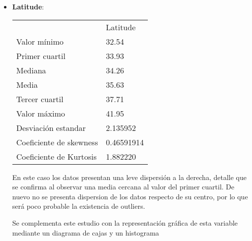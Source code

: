 {\begin{itemize}
Los estadísticos resultantes nos muestran una distribución con una medida de asimetria muy cercana al valor cero, lo que nos indica que la distribución de esta se aproxima a una distribucion normal, pero con cierta dispersión de los datos a la derecha, hecho que claramente se refleja con un valor de la media muy cercano al valor del tercer cuartil.
Un coeficiente de Kurtosis tan cercano a cero nos indica que no se presenta dispersión de los valores respecto al centro de densidad de la distribución.

Se estudia de forma gráfica estos resultados por medio de un diagrama de cajas:

??? Imagen boxplot

Efectivamente el diagrama de cajas nos muestra que los datos se concentran en una región central densa, sin presencia de outliers.
Observemos la distribución de los valores en más detalle en un histograma

??? Imagen histo






	\item \textbf{Latitude}: 
	\begin{table}[]
		\begin{tabular}{ll}
			& Latitude   \\
			Valor mínimo            & 32.54      \\
			Primer cuartil          & 33.93      \\
			Mediana                 & 34.26      \\
			Media                   & 35.63      \\
			Tercer cuartil          & 37.71      \\
			Valor máximo            & 41.95      \\ \hline
			Desviación estandar     & 2.135952   \\ \hline
			Coeficiente de skewness & 0.46591914 \\
			Coeficiente de Kurtosis & 1.882220  
		\end{tabular}
	\end{table}

En este caso los datos presentan una leve dispersión a la derecha, detalle que se confirma al observar una media cercana al valor del primer cuartil. De nuevo no se presenta dispersion de los datos respecto de su centro, por lo que será poco probable la existencia de outliers.

Se complementa este estudio con la representación gráfica de esta variable mediante un diagrama de cajas y un histograma


\end{itemize}}
